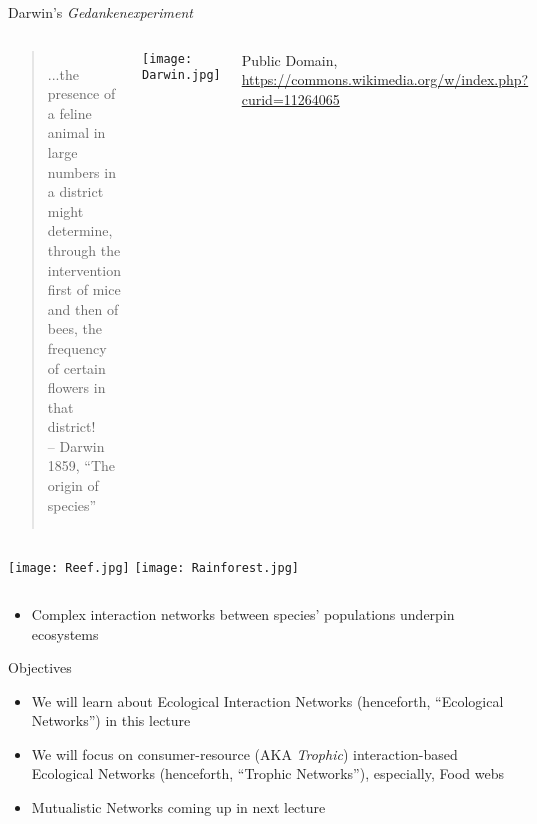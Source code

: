 \begin{frame}{Darwin's {\it Gedankenexperiment}}

\begin{columns}[c]
  \centering
  \vspace*{\fill} 
  \begin{quote} 
    ...the presence of a feline animal in large numbers in a district 
  might determine, through the intervention first of mice and then of 
  bees, the frequency of certain flowers in that district!\\
    \centering 
    \hfill -- {\small Darwin 1859, ``The origin of species''}
  \end{quote}
  \vspace*{\fill}
  \centering
  \vspace*{\fill} 
  \texttt{[image: Darwin.jpg]}\\
  {\tiny Public Domain, \url{https://commons.wikimedia.org/w/index.php?curid=11264065} \par} 
  \vspace*{\fill}
\end{columns}

\vspace{5pt}
\begin{columns}[c]
  \centering
    \texttt{[image: Reef.jpg]}
  \centering
    \texttt{[image: Rainforest.jpg]}
\end{columns}
\vspace{6pt}
\pause 
\begin{itemize}
  \item Complex interaction networks between species' populations underpin ecosystems
\end{itemize}
  
\end{frame}

\begin{frame}{Objectives}

  \vspace{6pt}
  \begin{itemize}[<+->]\setlength{\itemindent}{0em} \itemsep20pt
      \item We will learn about Ecological Interaction Networks (henceforth, ``Ecological Networks'') in this lecture
      \item We will focus on consumer-resource (AKA {\it Trophic}) interaction-based Ecological Networks (henceforth, ``Trophic Networks''), especially, Food webs 
      
      \item Mutualistic Networks coming up in next lecture
  \end{itemize}
  
\end{frame}

